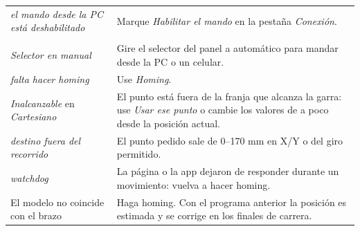 \documentclass[a4paper,11pt]{article}
\begin{document}
\begin{center}
\begin{longtable}{>{\raggedright}p{5.6cm} >{\raggedright\arraybackslash}p{10.2cm}}
\emph{el mando desde la PC está deshabilitado} & Marque \emph{Habilitar el mando} en la pestaña \emph{Conexión}.\\
\multicolumn{2}{@{}l}{\textbf{Movimiento}}\\
\emph{Selector en manual} & Gire el selector del panel a automático para mandar desde la PC o un celular.\\
\emph{falta hacer homing} & Use \emph{Homing}.\\
\emph{Inalcanzable} en \emph{Cartesiano} & El punto está fuera de la franja que alcanza la garra: use \emph{Usar ese punto} o cambie los valores de a poco desde la posición actual.\\
\emph{destino fuera del recorrido} & El punto pedido sale de 0--170 mm en X/Y o del giro permitido.\\
\emph{watchdog} & La página o la app dejaron de responder durante un movimiento: vuelva a hacer homing.\\
El modelo no coincide con el brazo & Haga homing. Con el programa anterior la posición es estimada y se corrige en los finales de carrera.\\
\bottomrule
\end{longtable}
\end{center}

\end{document}

